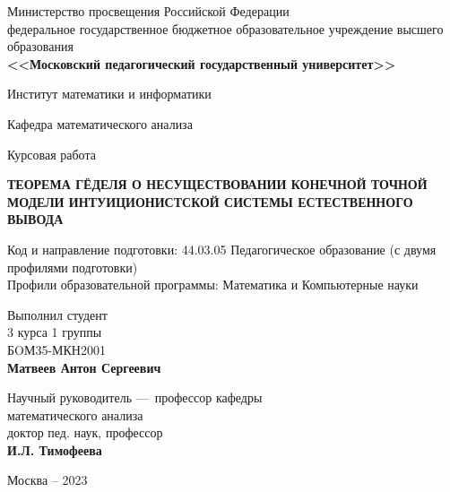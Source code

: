 \thispagestyle{empty} %

\begin{center}
	Министерство просвещения Российской Федерации \\
	федеральное государственное бюджетное образовательное учреждение высшего образования\\
	\textbf{<<Московский педагогический государственный университет>>}
	
	\vspace{10mm}
	
	Институт математики и информатики
	
	\vspace{4mm}
	
	Кафедра математического анализа
	
	\vspace{17mm}
	
	{\fontsize{18}{21.6}\selectfont Курсовая работа}
	
	\vspace{10mm}
	
	\textbf{\fontsize{18}{21.6}\selectfont ТЕОРЕМА ГЁДЕЛЯ О НЕСУЩЕСТВОВАНИИ КОНЕЧНОЙ ТОЧНОЙ МОДЕЛИ ИНТУИЦИОНИСТСКОЙ СИСТЕМЫ ЕСТЕСТВЕННОГО ВЫВОДА}
	
	\vspace{10mm}
\end{center}

\hspace{0.5cm}
\begin{minipage}{0.9\textwidth}
	\begin{flushleft}
		\fontsize{12}{14.4}\selectfont Код и направление подготовки: 44.03.05 Педагогическое образование (с двумя профилями подготовки)\\
		Профили образовательной программы: Математика и Компьютерные науки
	\end{flushleft}
\end{minipage}

\vspace{12mm}

\hspace{90mm}
\begin{minipage}{0.37\textwidth}
	\begin{flushleft}
		Выполнил студент\\
		3 курса 1 группы\\
		БOМ35-МКН2001\\
		\textbf{Матвеев Антон Сергеевич}
		
		\vspace{7mm}
		
		Научный руководитель ---\
		профессор кафедры\\
		математического анализа\\
		доктор пед. наук, профессор\\
		\textbf{И.Л. Тимофеева}
	\end{flushleft}
\end{minipage}

\vfill

\begin{center}
	Москва -- 2023
\end{center}